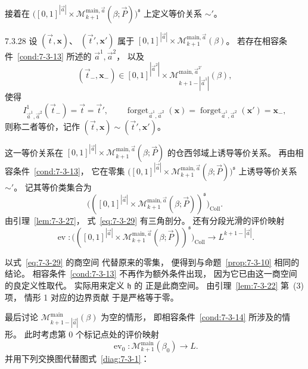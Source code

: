 
接着在
$\bigl([0,1]^{|\vec a|}\times
\mathcal M^{\mathrm{main},\vec a}_{k+1}
(\beta;\vec P)\bigr)^{\mathfrak s}$
上定义等价关系 $\sim'$。

\begin{definition}{7.3.28}\label{def:7-3-28}
设
$(\vec t,\mathbf x)$、
$(\vec t',\mathbf x')$
属于
$[0,1]^{|\vec a|}\times
\mathcal M^{\mathrm{main},\vec a}_{k+1}(\beta)$。
若存在相容条件~\ref{cond:7-3-13}
所述的 $\vec a^1,\vec a^2$，
以及
\[
(\vec t_-,\mathbf x_-)\in
[0,1]^{|\vec a^2|}\times
\mathcal M^{\mathrm{main},\vec a^{2\prime}}_{
k+1-|\vec a^1|}(\beta),
\]
使得
\[
I^1_{\vec a^1,\vec a^2}(\vec t_-)
=\vec t=\vec t',
\qquad
\operatorname{forget}_{\vec a^1,\vec a^2}
(\mathbf x)
=\operatorname{forget}_{\vec a^1,\vec a^2}
(\mathbf x')
=\mathbf x_-,
\]
则称二者等价，记作
$(\vec t,\mathbf x)\sim(\vec t',\mathbf x')$。
\end{definition}

这一等价关系在
$[0,1]^{|\vec a|}\times
\mathcal M^{\mathrm{main},\vec a}_{k+1}
(\beta;\vec P)$
的仓西邻域上诱导等价关系。
再由相容条件~\ref{cond:7-3-13}，
它在零集
$\bigl([0,1]^{|\vec a|}\times
\mathcal M^{\mathrm{main},\vec a}_{k+1}
(\beta;\vec P)\bigr)^{\mathfrak s}$
上诱导等价关系 $\sim'$。
记其等价类集合为
\begin{equation}
\bigl(
([0,1]^{|\vec a|}\times
\mathcal M^{\mathrm{main},\vec a}_{k+1}
(\beta;\vec P))^{\mathfrak s}
\bigr)_{\mathrm{Coll}}.
\tag{7.3.29}\label{eq:7-3-29}
\end{equation}
由引理~\ref{lem:7-3-27}，
式~\eqref{eq:7-3-29} 有三角剖分。
还有分段光滑的评价映射
\[
\operatorname{ev}\colon
\bigl(
([0,1]^{|\vec a|}\times
\mathcal M^{\mathrm{main},\vec a}_{k+1}
(\beta;\vec P))^{\mathfrak s}
\bigr)_{\mathrm{Coll}}
\longrightarrow L^{k+1-|\vec a|}.
\]

以式~\eqref{eq:7-3-29} 的商空间
代替原来的零集，
便得到与命题~\ref{prop:7-3-10} 相同的结论。
相容条件~\ref{cond:7-3-13}
不再作为额外条件出现，
因为它已由这一商空间的良定义性取代。
实际用来定义 $\mathfrak h$ 的
正是此商空间。
由引理~\ref{lem:7-3-22} 第~(3) 项，
情形 1 对应的边界贡献
于是严格等于零。

最后讨论
$\mathcal M^{\mathrm{main}}_{
k+1-|\vec a|}(\beta)$
为空的情形，
即相容条件~\ref{cond:7-3-14}
所涉及的情形。
此时考虑第 $0$ 个标记点处的评价映射
\begin{equation}
\operatorname{ev}_0\colon
\mathcal M^{\mathrm{main}}_{k+1}(\beta_0)
\longrightarrow L.
\tag{7.3.30}\label{eq:7-3-30}
\end{equation}
并用下列交换图代替图式~\ref{diag:7-3-1}：

